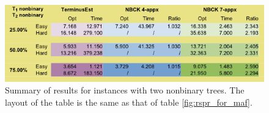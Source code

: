\begin{figure}[h]
	\centering
		\includegraphics[width=\textwidth]{../figs/table2.png}
	\caption{Summary of results for instances with two nonbinary trees. The layout of the table is the same as that of table \ref{fig:rspr_for_maf}.}
	\label{fig:maf_for_maf}
\end{figure}


% 
% 
% 




